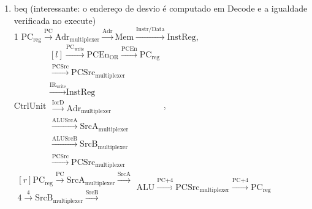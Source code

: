 \documentclass{article}
\begin{document}
\begin{enumerate}
\begin{enumerate}
\bigbreak

    \item beq (interessante: o endereço de desvio é computado em Decode e a igualdade verificada no execute)\\

1 $\text{PC}_\text{reg} \xrightarrow{\text{PC}} \text{Adr}_\text{multiplexer} \xrightarrow{\text{Adr}} \text{Mem} \xrightarrow{\text{Instr/Data}} \text{InstReg}$, $\text{CtrlUnit} \begin{matrix*}[l] 
\xrightarrow{\text{PC}_\text{write}} \text{PCEn}_\text{OR} \xrightarrow{\text{PCEn}} \text{PC}_\text{reg} \\ 
\xrightarrow{\text{PCSrc}} \text{PCSrc}_\text{multiplexer} \\
\xrightarrow{\text{IR}_\text{write}} \text{InstReg} \\
\xrightarrow{\text{IorD}} \text{Adr}_\text{multiplexer} \\ \xrightarrow{\text{ALUSrcA}} \text{SrcA}_\text{multiplexer} \\ \xrightarrow{\text{ALUSrcB}} \text{SrcB}_\text{multiplexer} \\ \xrightarrow{\text{PCSrc}} \text{PCSrc}_\text{multiplexer} \end{matrix*}$,\\ $\begin{matrix*}[r] \text{PC}_\text{reg} \xrightarrow{\text{PC}} \text{SrcA}_\text{multiplexer} \xrightarrow{\text{SrcA}} \\ \text{4} \xrightarrow{\text{4}} \text{SrcB}_\text{multiplexer} \xrightarrow{\text{SrcB}}\end{matrix*} \text{ALU} \xrightarrow{\text{PC+4}} \text{PCSrc}_\text{multiplexer} \xrightarrow{\text{PC+4}} \text{PC}_\text{reg}$\\

\bigbreak


\end{enumerate}
\end{enumerate}
\end{document}
